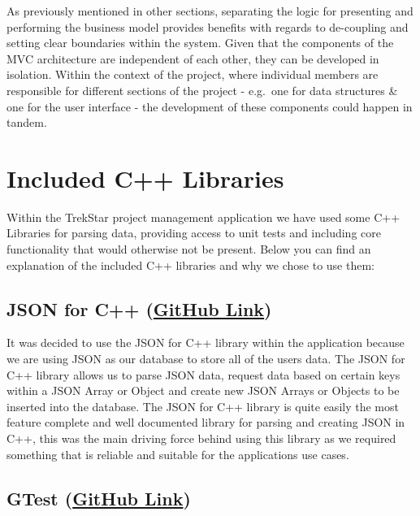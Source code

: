 \documentclass[
  english,
  a4paper,
,tablecaptionabove
]{scrartcl}
\begin{document}
As previously mentioned in other sections, separating the logic for
presenting and performing the business model provides benefits with
regards to de-coupling and setting clear boundaries within the system.
Given that the components of the MVC architecture are independent of
each other, they can be developed in isolation. Within the context of
the project, where individual members are responsible for different
sections of the project - e.g.~one for data structures \& one for the
user interface - the development of these components could happen in
tandem.

\newpage

\hypertarget{included-c-libraries}{%
\section{Included C++ Libraries}\label{included-c-libraries}}

Within the TrekStar project management application we have used some C++
Libraries for parsing data, providing access to unit tests and including
core functionality that would otherwise not be present. Below you can
find an explanation of the included C++ libraries and why we chose to
use them:

\hypertarget{json-for-c-github-link}{%
\subsection{\texorpdfstring{JSON for C++
(\href{https://github.com/nlohmann/json}{GitHub
Link})}{JSON for C++ (GitHub Link)}}\label{json-for-c-github-link}}

It was decided to use the JSON for C++ library within the application
because we are using JSON as our database to store all of the users
data. The JSON for C++ library allows us to parse JSON data, request
data based on certain keys within a JSON Array or Object and create new
JSON Arrays or Objects to be inserted into the database. The JSON for
C++ library is quite easily the most feature complete and well
documented library for parsing and creating JSON in C++, this was the
main driving force behind using this library as we required something
that is reliable and suitable for the applications use cases.

\hypertarget{gtest-github-link}{%
\subsection{\texorpdfstring{GTest
(\href{https://github.com/google/googletest}{GitHub
Link})}{GTest (GitHub Link)}}\label{gtest-github-link}}
\end{document}
